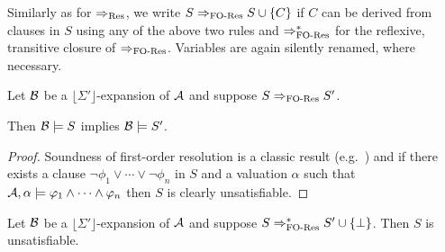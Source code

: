 \documentclass[a4paper,twoside,notitlepage,openright,11pt]{report}
\begin{document}


\medskip

\bigskip

Similarly as for $\Rightarrow_{\operatorname{Res}}$, we write $S\Rightarrow_{\operatorname{{FO-Res}}} S\cup\{C\}$ if $C$ can be derived from clauses in $S$ using any of the above two rules and $\Rightarrow_{\operatorname{{FO-Res}}}^*$ for the reflexive, transitive closure of $\Rightarrow_{\operatorname{{FO-Res}}}$. Variables are again silently renamed, where necessary.

\begin{lemma}
  Let $\mathcal B$ be a $\lfloor\Sigma'\rfloor$-expansion of $\mathcal A$ and suppose $S\Rightarrow_{\operatorname{{FO-Res}}} S'$.
  
  Then $\mathcal B\models S$ implies $\mathcal B\models S'$.
\end{lemma}
\begin{proof}
  Soundness of first-order resolution is a classic result (e.g.\ \cite{R65,F96}) and if there exists a clause $\neg\phi_1\lor\cdots\lor\neg\phi_n$ in $S$ and a valuation $\alpha$ such that $\mathcal A,\alpha\models\varphi_1\land\cdots\land\varphi_n$ then $S$ is clearly unsatisfiable.
\end{proof}
\begin{corollary}
  \label{cor:folsoundness}
  Let $\mathcal B$ be a $\lfloor\Sigma'\rfloor$-expansion of $\mathcal A$ and suppose $S\Rightarrow_{\operatorname{{FO-Res}}}^*S'\cup\{\bot\}$.   
  Then $S$ is unsatisfiable.
\end{corollary}
\end{document}
